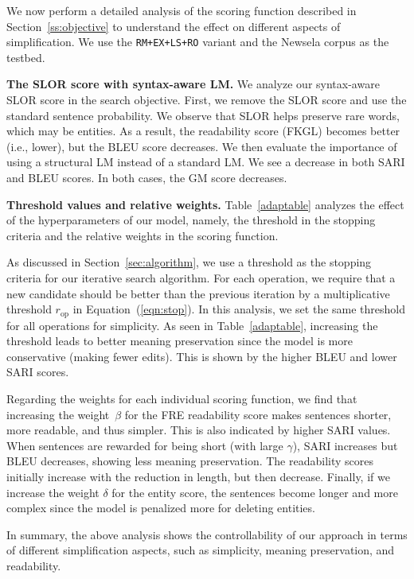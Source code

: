 \documentclass[11pt,a4paper]{article}
\begin{document}
We now perform a detailed analysis of the scoring function described in Section~\ref{ss:objective} to understand the effect on different aspects of simplification.  We use the  {\tt RM+EX+LS+RO} variant and the Newsela corpus as the testbed.

\textbf{The SLOR score with syntax-aware LM.}
We analyze our syntax-aware SLOR score in the search objective. First, we remove the SLOR score and use the standard sentence probability. We observe that SLOR helps preserve rare words, which may be entities. As a result,
the readability score (FKGL) becomes better (i.e., lower), but the BLEU score decreases. 
We then evaluate the importance of using a structural LM instead of a standard LM. We see a decrease in both SARI and BLEU scores. In both cases, the GM score decreases.

\textbf{Threshold values and relative weights.}
Table~\ref{adaptable} analyzes the effect of the hyperparameters of our model, namely, the threshold in the stopping criteria and the relative weights in the scoring function.

As discussed in Section~\ref{sec:algorithm}, we use a threshold as the stopping criteria for our iterative search algorithm. For each operation, we require that a new candidate should be better than the previous iteration by a multiplicative threshold $r_{\operatorname{op}}$ in Equation~(\ref{eqn:stop}). In this analysis, we set the same threshold for all operations for simplicity.
As seen in Table~\ref{adaptable}, 
increasing the threshold leads to better meaning preservation since the model is more conservative (making fewer edits). This is shown by the higher BLEU and lower SARI scores. 

Regarding the weights for each individual scoring function, we find that increasing the weight~$\beta$ for the FRE readability score makes sentences shorter, more readable, and thus simpler. This is also indicated by  higher SARI values. 
When sentences are rewarded for being short (with large $\gamma$), SARI increases but BLEU decreases, showing less meaning preservation. 
The readability scores initially increase with the reduction in length, but then decrease. 
Finally, if we increase the weight $\delta$ for the entity score, the sentences become longer and more complex since the model is penalized more for deleting entities. 

In summary, the above analysis shows the controllability of our approach in terms of different simplification aspects, such as simplicity, meaning preservation, and readability.
\end{document}
